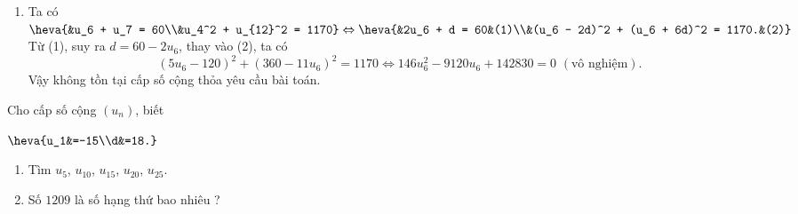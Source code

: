 \begin{bt}[TH]
{\begin{enumerate}
			Vậy số hạng đầu của cấp số cộng là $u_1 = 3$, công sai là $d = 2$ hoặc $u_1 = -17$, $d = 2$.
			\item Ta có $\heva{&u_6 + u_7 = 60\\&u_4^2 + u_{12}^2 = 1170} \Leftrightarrow \heva{&2u_6 + d = 60&(1)\\&(u_6 - 2d)^2 + (u_6 + 6d)^2 = 1170.&(2)}$\\
			Từ (1), suy ra $d = 60 - 2u_6$, thay vào (2), ta có
			$$(5u_6 - 120)^2 + (360 - 11u_6)^2 = 1170 \Leftrightarrow 146u_6^2 - 9120u_6 + 142830 = 0 \,\, (\text{vô nghiệm}).$$ 
			Vậy không tồn tại cấp số cộng thỏa yêu cầu bài toán.
		\end{enumerate}
	}
\end{bt}

\begin{vd}[NB]%
	Cho cấp số cộng $(u_n)$, biết
	\begin{center}
		$\heva{u_1&=-15\\d&=18.}$
	\end{center}
	\begin{enumerate}
		\item Tìm $u_5$, $u_{10}$, $u_{15}$, $u_{20}$, $u_{25}.$
		\item Số $1209$ là số hạng thứ bao nhiêu ?
	\end{enumerate}
\end{vd}

